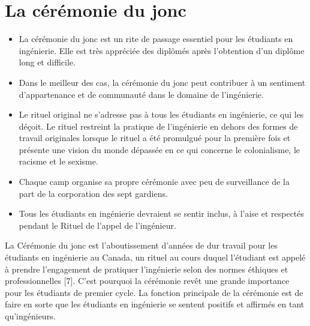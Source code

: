 \section{La cérémonie du jonc}\label{la-ceremonie-du-jonc}



\begin{itemize}
 \item La cérémonie du jonc est un rite de passage essentiel pour les étudiants en ingénierie. Elle est très appréciée des diplômés après l'obtention d'un diplôme long et difficile.
 \item Dans le meilleur des cas, la cérémonie du jonc peut contribuer à un sentiment d'appartenance et de communauté dans le domaine de l'ingénierie.
 \item Le rituel original ne s'adresse pas à tous les étudiants en ingénierie, ce qui les déçoit. Le rituel restreint la pratique de l'ingénierie en dehors des formes de travail originales lorsque le rituel a été promulgué pour la première fois et présente une vision du monde dépassée en ce qui concerne le colonialisme, le racisme et le sexisme.
 \item Chaque camp organise sa propre cérémonie avec peu de surveillance de la part de la corporation des sept gardiens.
 \item Tous les étudiants en ingénierie devraient se sentir inclus, à l'aise et respectés pendant le Rituel de l'appel de l'ingénieur.
\end{itemize}


La Cérémonie du jonc est l'aboutissement d'années de dur travail pour les étudiants en ingénierie au Canada, un rituel au cours duquel l'étudiant est appelé à prendre l'engagement de pratiquer l'ingénierie selon des normes éthiques et professionnelles [7]. C'est pourquoi la cérémonie revêt une grande importance pour les étudiants de premier cycle. La fonction principale de la cérémonie est de faire en sorte que les étudiants en ingénierie se sentent positifs et affirmés en tant qu'ingénieurs.

